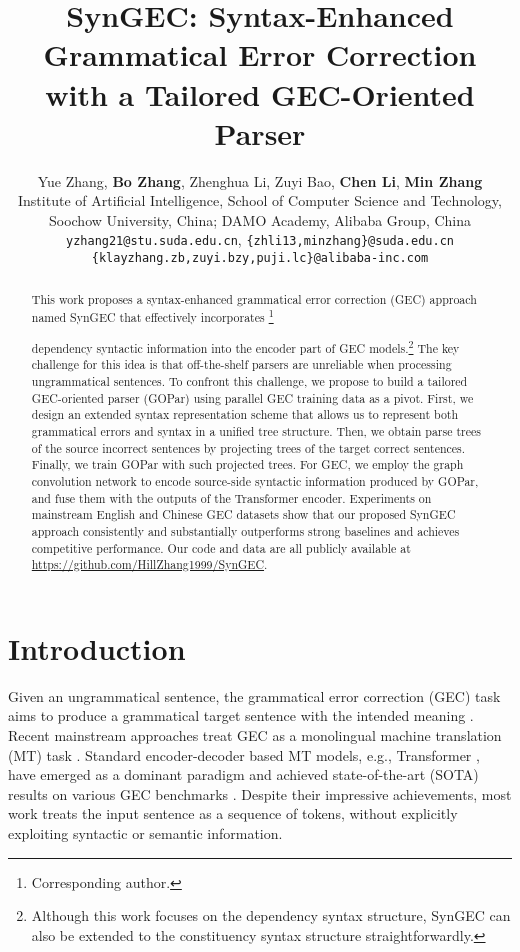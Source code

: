 \documentclass[11pt]{article}
\title{SynGEC: Syntax-Enhanced Grammatical Error Correction \\ with a Tailored GEC-Oriented Parser}
\author{Yue Zhang, {\bf Bo Zhang}, Zhenghua Li, Zuyi Bao,   {\bf Chen Li}, {\bf Min Zhang} \\
        Institute of Artificial Intelligence, School of Computer Science and Technology, \\
Soochow University, China; DAMO Academy, Alibaba Group, China\\
\texttt{yzhang21@stu.suda.edu.cn}, \texttt{\{zhli13,minzhang\}@suda.edu.cn}\\\texttt{\{klayzhang.zb,zuyi.bzy,puji.lc\}@alibaba-inc.com}}
\newcommand\blfootnote[1]{\begingroup
  \renewcommand\thefootnote{}\footnote{#1}\addtocounter{footnote}{-1}\endgroup
}
\begin{document}
\maketitle
\begin{abstract}


This work proposes a syntax-enhanced grammatical error correction (GEC) approach named SynGEC that effectively incorporates \blfootnote{ Corresponding author.} dependency syntactic information into the encoder part of GEC models.\footnote{Although this work focuses on the dependency syntax structure, SynGEC can also be extended to the constituency syntax structure straightforwardly.} The key challenge for this idea is 
that off-the-shelf parsers are unreliable when processing 
ungrammatical sentences. 
To confront this challenge, we propose to build a tailored GEC-oriented parser (GOPar) using parallel GEC training data as a pivot. 
First, we design an extended syntax representation scheme that allows us to represent both grammatical errors and syntax in a unified tree structure.
Then, we obtain parse trees of the source incorrect sentences by projecting trees of the target correct sentences.
Finally, we train GOPar with such projected trees. 
For GEC, we employ the graph convolution network to encode source-side syntactic information produced by GOPar, and fuse them with the outputs of the Transformer encoder.
Experiments on mainstream English and Chinese GEC datasets show that our proposed SynGEC approach consistently and substantially outperforms strong baselines and achieves competitive performance. Our code and data are all publicly available at \url{https://github.com/HillZhang1999/SynGEC}. 


\end{abstract} 
\section{Introduction}
\label{intro}
Given an ungrammatical sentence, the grammatical error correction (GEC) task aims to produce a grammatical target sentence with the intended meaning \citep{grundkiewicz2020crash,wang2021comprehensive}. Recent mainstream approaches treat GEC as a monolingual machine translation (MT) task  \citep{yuan2016grammatical,junczys2018approaching}. 
Standard encoder-decoder based MT models,  e.g., Transformer \citep{vaswani2017attention}, have emerged as a dominant paradigm and achieved  state-of-the-art (SOTA) results on various GEC benchmarks \citep{rothe2021recipe, stahlberg2021synthetic, sun2022unified, zhang2022mucgec}. 
Despite their impressive achievements, most work treats the input sentence as a sequence of tokens, without explicitly exploiting syntactic or semantic information. 
\end{document}
